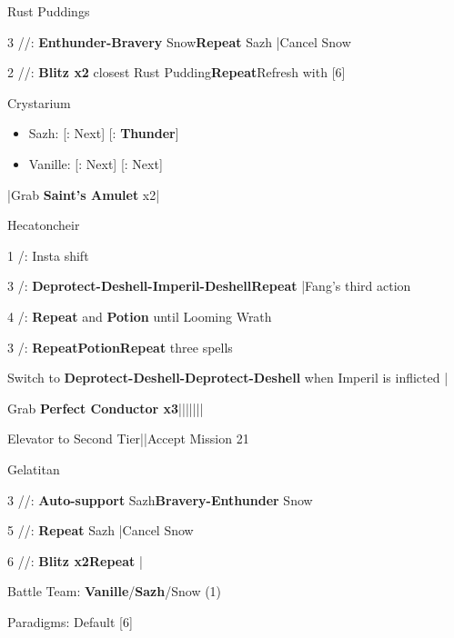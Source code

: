 \begin{fight}{Rust Puddings}
	\item [3] \syn/\med/\com: \textbf{Enthunder-Bravery} Snow\to \textbf{Repeat} Sazh |Cancel Snow
	\item [2] \com/\med/\com: \textbf{Blitz x2} closest Rust Pudding\to \textbf{Repeat}\to Refresh with [6]
\end{fight}
\begin{menu}
	\item Crystarium
	\begin{itemize}
		\item Sazh: [\com: Next] [\rav: \textbf{Thunder}]
		\item Vanille: [\med: Next] [\sab: Next]
	\end{itemize}
\end{menu}
\begin{mainlist}
	\item \skip|Grab \textbf{Saint's Amulet} x2|\skip
\end{mainlist}
\begin{fight}{Hecatoncheir}
	\item [1] \com/\rav: Insta shift
	\item [3] \sab/\com: \textbf{Deprotect-Deshell-Imperil-Deshell}\to \textbf{Repeat} |Fang's third action
	\item [4] \sab/\sen: \textbf{Repeat} and \textbf{Potion} until Looming Wrath
	\item [3] \sab/\com: \textbf{Repeat}\to \textbf{Potion}\to \textbf{Repeat} three spells
	\item Switch to \textbf{Deprotect-Deshell-Deprotect-Deshell} when Imperil is inflicted |\skip
\end{fight}
\begin{mainlist}
	\item Grab \textbf{Perfect Conductor x3}|\skip||||\skip|\skip|\skip
	\item Elevator to Second Tier|\skip|Accept Mission 21
\end{mainlist}
\begin{fight}{Gelatitan}
	\item [3] \syn/\med/\com: \textbf{Auto-support} Sazh\to \textbf{Bravery-Enthunder} Snow
	\item [5] \syn/\sab/\com: \textbf{Repeat} Sazh |Cancel Snow
	\item [6] \com/\rav/\com: \textbf{Blitz x2}\to \textbf{Repeat} |\skip
\end{fight}
\begin{menu}
	\item Battle Team: \textbf{Vanille}/\textbf{Sazh}/Snow (1)
	\item Paradigms: Default [6]
\end{menu}
